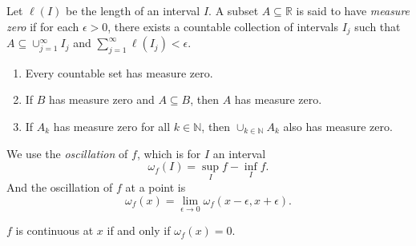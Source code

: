 \begin{definition}{}{}
    Let \(\ell(I)\) be the length of an interval \(I\). A subset \(A \subseteq \mathbb{R}\) is said to have \textit{measure zero} if for each \(\epsilon > 0\), there exists a countable collection of intervals \(I_j\) such that \(A \subseteq \cup_{j=1}^\infty I_j\) and \(\sum_{j=1}^\infty \ell(I_j) < \epsilon\).
\end{definition}
\begin{lemma}{}{}
    \begin{enumerate}
        \item Every countable set has measure zero.
        \item If \(B\) has measure zero and \(A \subseteq B\), then \(A\) has measure zero.
        \item If \(A_k\) has measure zero for all \(k \in \mathbb{N}\), then \(\cup_{k\in\mathbb{N}}A_k\) also has measure zero.
    \end{enumerate}
\end{lemma}
We use the \textit{oscillation} of \(f\), which is for \(I\) an interval
\[
    \omega_f(I) = \sup_I f - \inf_I f.
\]
And the oscillation of \(f\) at a point is
\[
    \omega_f(x) = \lim_{\epsilon\to 0} \omega_f(x-\epsilon,x+\epsilon).
\]
\begin{lemma}{}{}
    \(f\) is continuous at \(x\) if and only if \(\omega_f(x) = 0\).
\end{lemma}
